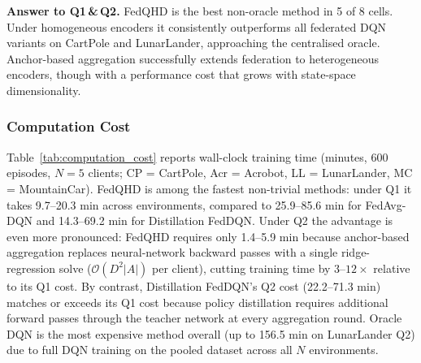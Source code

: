 \textbf{Answer to Q1\,\&\,Q2.}
FedQHD is the best non-oracle method in 5 of 8 cells.
Under homogeneous encoders it consistently outperforms all federated DQN variants on CartPole and LunarLander, approaching the centralised oracle.
Anchor-based aggregation successfully extends federation to heterogeneous encoders, though with a performance cost that grows with state-space dimensionality.

\subsubsection{Computation Cost}

Table~\ref{tab:computation_cost} reports wall-clock training time (minutes, 600 episodes, $N=5$ clients; CP = CartPole, Acr = Acrobot, LL = LunarLander, MC = MountainCar).
FedQHD is among the fastest non-trivial methods: under Q1 it takes 9.7--20.3 min across environments, compared to 25.9--85.6 min for FedAvg-DQN and 14.3--69.2 min for Distillation FedDQN.
Under Q2 the advantage is even more pronounced: FedQHD requires only 1.4--5.9 min because anchor-based aggregation replaces neural-network backward passes with a single ridge-regression solve ($\mathcal{O}(D^2|A|)$ per client), cutting training time by $3$--$12\times$ relative to its Q1 cost.
By contrast, Distillation FedDQN's Q2 cost (22.2--71.3 min) matches or exceeds its Q1 cost because policy distillation requires additional forward passes through the teacher network at every aggregation round.
Oracle DQN is the most expensive method overall (up to 156.5 min on LunarLander Q2) due to full DQN training on the pooled dataset across all $N$ environments.

